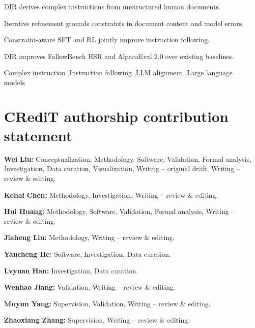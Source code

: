 \documentclass[a4paper,fleqn]{cas-dc}
\begin{document}
\begin{highlights}
\item DIR derives complex instructions from unstructured human documents.
\item Iterative refinement grounds constraints in document content and model errors.
\item Constraint-aware SFT and RL jointly improve instruction following.
\item DIR improves FollowBench HSR and AlpacaEval 2.0 over existing baselines.
\end{highlights}

\begin{keywords}
Complex instruction \sep Instruction following \sep LLM alignment \sep Large language models
\end{keywords}

\maketitle










\section*{CRediT authorship contribution statement}
\textbf{Wei Liu:} Conceptualization, Methodology, Software, Validation, Formal analysis, Investigation, Data curation, Visualization, Writing -- original draft, Writing -- review \& editing.

\textbf{Kehai Chen:} Methodology, Investigation, Writing -- review \& editing.

\textbf{Hui Huang:} Methodology, Software, Validation, Formal analysis, Writing -- review \& editing.

\textbf{Jiaheng Liu:} Methodology, Writing -- review \& editing.

\textbf{Yancheng He:} Software, Investigation, Data curation.

\textbf{Lvyuan Han:} Investigation, Data curation.

\textbf{Wenhao Jiang:} Validation, Writing -- review \& editing.

\textbf{Muyun Yang:} Supervision, Validation, Writing -- review \& editing.

\textbf{Zhaoxiang Zhang:} Supervision, Writing -- review \& editing.
\end{document}
